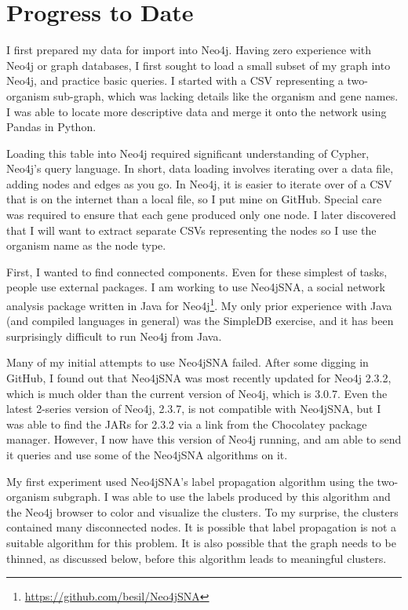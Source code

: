 \documentclass[12pt]{article}
\begin{document}


\section{Progress to Date} %

I first prepared my data for import into Neo4j. 
Having zero experience with Neo4j or graph databases, I first sought to load a small subset of my graph into Neo4j, and practice basic queries.
I started with a CSV representing a two-organism sub-graph, which was lacking details like the organism and gene names.
I was able to locate more descriptive data and merge it onto the network using Pandas in Python. 

Loading this table into Neo4j required significant understanding of Cypher, Neo4j's query language.
In short, data loading involves iterating over a data file, adding nodes and edges as you go. 
In Neo4j, it is easier to iterate over of a CSV that is on the internet than a local file, so I put mine on GitHub. 
Special care was required to ensure that each gene produced only one node. 
I later discovered that I will want to extract separate CSVs representing the nodes so I use the organism name as the node type.

First, I wanted to find connected components.  
Even for these simplest of tasks, people use external packages.
I am working to use Neo4jSNA, a social network analysis package written in Java for Neo4j\footnote{\url{https://github.com/besil/Neo4jSNA}}.
My only prior experience with Java (and compiled languages in general) was the SimpleDB exercise, and it has been surprisingly difficult to run Neo4j from Java.

Many of my initial attempts to use Neo4jSNA failed.
After some digging in GitHub, I found out that Neo4jSNA was most recently updated for Neo4j 2.3.2, which is much older than the current version of Neo4j, which is 3.0.7. 
Even the latest 2-series version of Neo4j, 2.3.7, is not compatible with Neo4jSNA, but I was able to find the JARs for 2.3.2 via a link from the Chocolatey package manager.
However, I now have this version of Neo4j running, and am able to send it queries and use some of the Neo4jSNA algorithms on it. 

My first experiment used Neo4jSNA's label propagation \cite{fortunato2010community} algorithm using the two-organism subgraph.
I was able to use the labels produced by this algorithm and the Neo4j browser to color and visualize the clusters.
To my surprise, the clusters contained many disconnected nodes. 
It is possible that label propagation is not a suitable algorithm for this problem.
It is also possible that the graph needs to be thinned, as discussed below, before this algorithm leads to meaningful clusters. 
\end{document}

